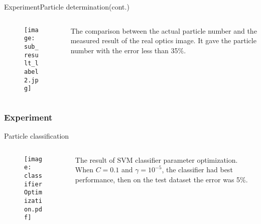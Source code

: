 \documentclass[14pt,hyperref={CJKbookmarks=true}]{beamer}
\theoremstyle{plain}
\theoremstyle{definition}
\theoremstyle{remark}
\begin{document}
\begin{frame}{Experiment}{Particle determination(cont.)}
\begin{columns}[onlytextwidth]
\begin{column}{0.6\textwidth}
\begin{figure}
\texttt{[image: sub\_result\_label2.jpg]}
\end{figure}
\end{column}
\begin{column}{0.3\textwidth}
\small
The comparison between the actual particle number and the measured result of the real optics image. It gave the particle number with the error less than 35\%.
\end{column}
\end{columns}
\end{frame}

\begin{frame}
\frametitle{Experiment}{Particle classification}
\begin{columns}[onlytextwidth]
\begin{column}{0.6\textwidth}
\begin{figure}
\texttt{[image: classifierOptimization.pdf]}
\end{figure}
\end{column}
\begin{column}{0.3\textwidth}
\small
The result of SVM classifier parameter optimization. When $C=0.1$ and $\gamma=10^{-5}$, the classifier had best performance, then on the test dataset the error was 5\%. 
\end{column}
\end{columns}
\end{frame}
\end{document}
